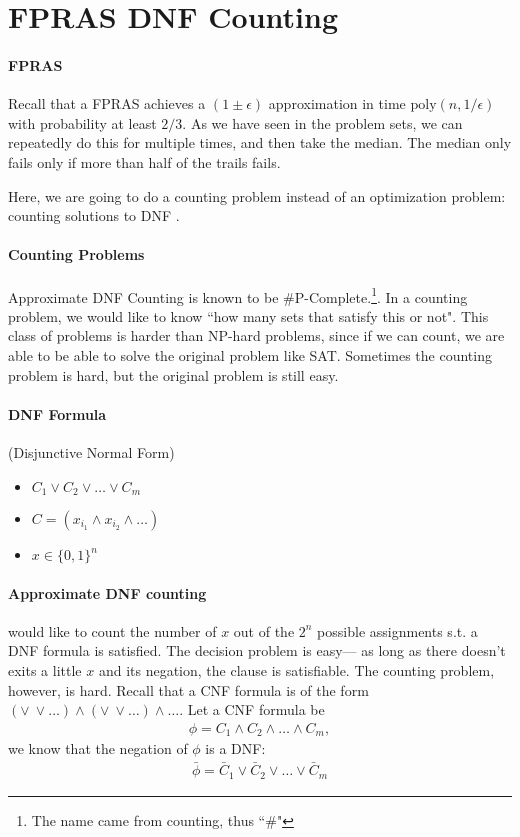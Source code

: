 \documentclass[11pt]{article}
\newcommand{\lqq}{``}
\theoremstyle{definition}
\theoremstyle{remark}
\begin{document}
\section{FPRAS DNF Counting}

\paragraph{FPRAS} Recall that a FPRAS achieves a $(1 \pm \epsilon) $ approximation in time  $\mathrm{poly} (n, 1/\epsilon)$ with probability at least $2/3$. As we have seen in the problem sets, we can repeatedly do this for multiple times, and then take the median. The median only fails only if more than half of the trails fails.


Here, we are going to do a counting problem instead of an optimization problem: counting solutions to DNF \cite{KarpJA89}.

\paragraph{Counting Problems} Approximate DNF Counting is known to be \#P-Complete.\footnote{The name came from counting, thus \lqq\#"}. In a counting problem, we would like to know ``how many sets that satisfy this or not". This class of problems is harder than NP-hard problems, since if we can count, we are able to be able to solve the original problem like SAT. Sometimes the counting problem is hard, but the original problem is still easy.

\paragraph{DNF Formula} (Disjunctive Normal Form) 
\begin{itemize}
	\item $C_1 \vee C_2 \vee \dots \vee C_m$
	\item $C = (x_{i_1} \wedge x_{i_2} \wedge \dots)$
	\item $x \in \{0, 1\}^n$
\end{itemize}

\paragraph{Approximate DNF counting}
%
would like to count the number of $x$ out of the $2^n$ possible assignments s.t. a DNF formula is satisfied. The decision problem is easy--- as long as there doesn't exits a little $x$ and its negation, the clause is satisfiable. The counting problem, however, is hard. Recall that a CNF formula is of the form $(\vee~\vee \dots ) \wedge (\vee ~\vee \dots) \wedge \dots$. Let a CNF formula be
\begin{align*}
	\phi = C_1 \wedge C_2 \wedge \dots \wedge C_m,
\end{align*}
we know that the negation of $\phi$ is a DNF:
\begin{align*}
	\bar{\phi} = \bar{C}_1 \vee \bar{C}_2 \vee \dots \vee \bar{C}_m
\end{align*}
\end{document}
